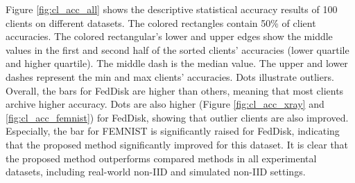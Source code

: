 \documentclass[mathfont=newtx]{uai2023} %
\newcommand{\MethodnameShort}{FedDisk}
\newcommand\parties{100}
\begin{document}
Figure \ref{fig:cl_acc_all} shows the descriptive statistical accuracy results of \parties{} clients on different datasets. The colored rectangles contain 50\% of client accuracies. The colored rectangular's lower and upper edges show the middle values in the first and second half of the sorted clients' accuracies (lower quartile and higher quartile). The middle dash is the median value. The upper and lower dashes represent the min and max clients' accuracies. Dots illustrate outliers. Overall, the bars for \MethodnameShort{} are higher than others, meaning that most clients archive higher accuracy. Dots are also higher (Figure \ref{fig:cl_acc_xray} and \ref{fig:cl_acc_femnist}) for \MethodnameShort{}, showing that outlier clients are also improved. Especially, the bar for FEMNIST is significantly raised for \MethodnameShort{}, indicating that the proposed method significantly improved for this dataset. It is clear that the proposed method outperforms compared methods in all experimental datasets, including real-world non-IID and simulated non-IID settings.
\end{document}
